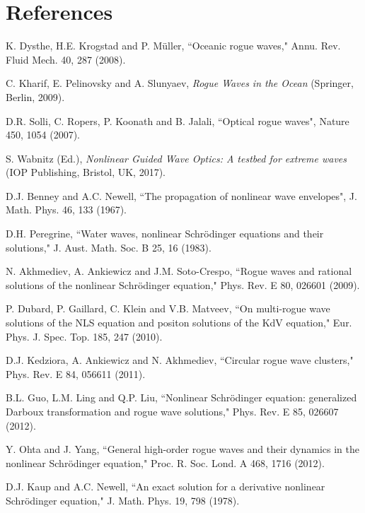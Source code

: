 \documentclass[amsmath,amssymb]{revtex4}
\begin{document}
\section*{References}
\vspace{-0.5cm}
\begin{thebibliography}{10}
K. Dysthe, H.E. Krogstad and P. M\"uller,
``Oceanic rogue waves,"
Annu. Rev. Fluid Mech. 40, 287 (2008).

C. Kharif, E. Pelinovsky and A. Slunyaev,
\emph{Rogue Waves in the Ocean} (Springer, Berlin, 2009).

D.R. Solli, C. Ropers, P. Koonath and B. Jalali,
``Optical rogue waves",
Nature 450, 1054 (2007).

S. Wabnitz (Ed.), \emph{Nonlinear Guided Wave Optics: A testbed for extreme waves} (IOP Publishing, Bristol, UK, 2017).

D.J. Benney and A.C. Newell,
``The propagation of nonlinear wave envelopes",
J. Math. Phys. 46, 133 (1967).

D.H. Peregrine,
``Water waves, nonlinear Schr\"odinger equations and their solutions,"
J. Aust. Math. Soc. B 25, 16 (1983).

N. Akhmediev, A. Ankiewicz and J.M. Soto-Crespo,
``Rogue waves and rational solutions of the nonlinear Schr\"odinger equation,"
Phys. Rev. E 80, 026601 (2009).

P. Dubard, P. Gaillard, C. Klein and V.B. Matveev,
``On multi-rogue wave solutions of the NLS equation and positon solutions of the KdV equation,"
Eur. Phys. J. Spec. Top. 185, 247 (2010).

D.J. Kedziora, A. Ankiewicz and N. Akhmediev,
``Circular rogue wave clusters,"
Phys. Rev. E  84, 056611 (2011).

B.L. Guo, L.M. Ling and Q.P. Liu,
``Nonlinear Schr\"odinger equation: generalized Darboux transformation and rogue wave solutions,"
Phys. Rev. E 85, 026607 (2012).

Y. Ohta and J. Yang,
``General high-order rogue waves and their dynamics in the nonlinear Schr\"odinger equation,"
Proc. R. Soc. Lond. A 468, 1716 (2012).

D.J. Kaup and A.C. Newell,
``An exact solution for a derivative nonlinear Schr\"odinger equation,"
J. Math. Phys. 19, 798 (1978).


\end{thebibliography}
\end{document}
